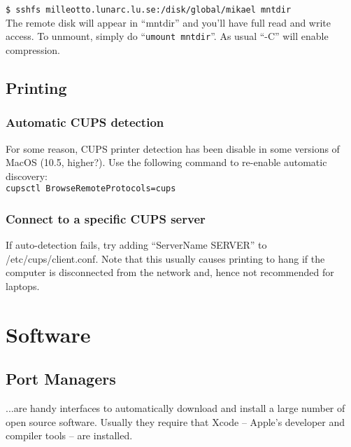 \documentclass[a4paper,10pt]{article}
\begin{document}
\verb+$ sshfs milleotto.lunarc.lu.se:/disk/global/mikael mntdir+\\

\noindent The remote disk will appear in ``mntdir'' and you'll have full read and write access. To unmount, simply do ``\verb+umount mntdir+''. As usual ``-C'' will enable compression.

\subsection{Printing}
\subsubsection{Automatic CUPS detection}
For some reason, CUPS printer detection has been disable in some versions of MacOS (10.5, higher?). Use the following command to re-enable automatic discovery:\\

\verb+cupsctl BrowseRemoteProtocols=cups+

\subsubsection{Connect to a specific CUPS server}
If auto-detection fails, try adding ``ServerName SERVER'' to /etc/cups/client.conf. Note that this usually causes printing to hang if the computer is disconnected from the network and, hence not recommended for laptops.


\section{Software}
\subsection{Port Managers}
...are handy interfaces to automatically download and install a large number of open source software. Usually they require that Xcode -- Apple's developer and compiler tools -- are installed.
\end{document}
